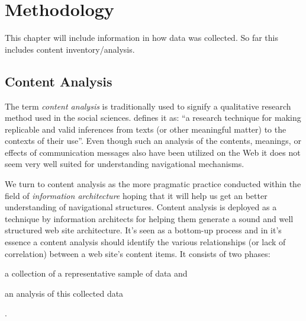 \chapter{Methodology}
\label{chapter:methodology}

This chapter will include information in how data was collected. So far this
includes content inventory/analysis.

\section{Content Analysis}

The term \emph{content analysis} is traditionally used to signify a
qualitative research method used in the social sciences.
\citet[p.~18]{krippendorff03} defines it as:
``a research technique for making replicable and valid
inferences from texts (or other meaningful matter) to the contexts of their
use''. Even though such an analysis of the contents, meanings, or effects of
communication messages also have been utilized on the Web \citep{weare00}
it does not seem very well suited for understanding navigational mechanisms.

We turn to content analysis as the more pragmatic practice conducted within
the field of \emph{information architecture}%
 hoping that it will help us get an better understanding of navigational
structures.
Content analysis is deployed as a technique by information architects for
helping them generate a sound and well structured web site architecture.
It's seen as a bottom-up process and
in it's essence a content analysis should identify the various
relationships (or lack of correlation) between a web site's content items.
It consists of two phases:
\begin{inparaenum}[(i)]
  \item a collection of a representative sample of data and
  \item an analysis of this collected data
\end{inparaenum}
\citep[pp.~241--243]{morville06}.

